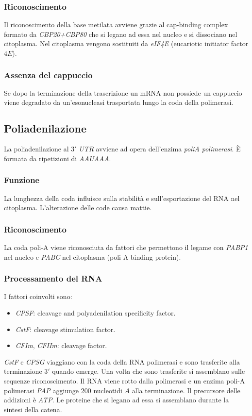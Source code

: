 		\subsubsection{Riconoscimento}
		Il riconoscimento della base metilata avviene grazie al cap-binding complex formato da \emph{CBP20+CBP80} che si legano ad essa nel nucleo e si dissociano nel citoplasma.
		Nel citoplasma vengono sostituiti da \emph{eIF4E} (eucariotic initiator factor $4E$).
		
		\subsubsection{Assenza del cappuccio}
		Se dopo la terminazione della trascrizione un mRNA non possiede un cappuccio viene degradato da un'esonucleasi trasportata lungo la coda della polimerasi.

	\subsection{Poliadenilazione}
	La poliadenilazione al $3'$ \emph{UTR} avviene ad opera dell'enzima \emph{poliA polimerasi}.
	\`E formata da ripetizioni di \emph{AAUAAA}.

		\subsubsection{Funzione}
		La lunghezza della coda influisce sulla stabilit\`a e sull'esportazione del RNA nel citoplasma.
		L'alterazione delle code causa mattie.

		\subsubsection{Riconoscimento}
		La coda poli-A viene riconosciuta da fattori che permettono il legame con \emph{PABP1} nel nucleo e \emph{PABC} nel citoplasma (poli-A binding protein).

		\subsubsection{Processamento del RNA}
		I fattori coinvolti sono:
		\begin{multicols}{2}
			\begin{itemize}
				\item \emph{CPSF}: cleavage and polyadenilation specificity factor.
				\item \emph{CstF}: cleavage stimulation factor.
				\item \emph{CFIm}, \emph{CFIIm}: cleavage factor.
			\end{itemize}
		\end{multicols}
		\emph{CstF} e \emph{CPSG} viaggiano con la coda della RNA polimerasi e sono trasferite alla terminazione $3'$ quando emerge.
		Una volta che sono trasferite si assemblano sulle sequenze riconoscimento.
		Il RNA viene rotto dalla polimerasi e un enzima poli-A polimerasi \emph{PAP} aggiunge $200$ nucleotidi $A$ alla terminazione.
		Il precursore delle addizioni \`e \emph{ATP}.
		Le proteine che si legano ad essa si assemblano durante la sintesi della catena.


